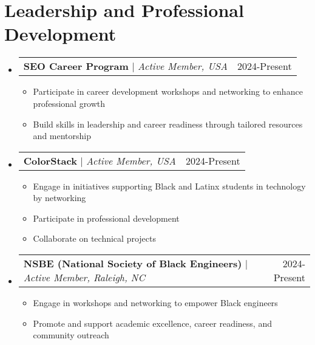 \documentclass[letterpaper,11pt]{article}
\makeatletter
\newcommand{\resumeItem}[1]{
  \item\small{
    {#1 \vspace{-2pt}}
  }
}
\newcommand{\resumeProjectHeading}[2]{
    \item
    \begin{tabular*}{0.97\textwidth}{l@{\extracolsep{\fill}}r}
      \small#1 & #2 \\
    \end{tabular*}\vspace{-7pt}
}
\newcommand{\resumeSubHeadingListStart}{\begin{itemize}[leftmargin=0.15in, label={}]}
\newcommand{\resumeSubHeadingListEnd}{\end{itemize}}
\newcommand{\resumeItemListStart}{\begin{itemize}}
\newcommand{\resumeItemListEnd}{\end{itemize}\vspace{-5pt}}
\makeatother
\begin{document}
 
 \section{Leadership and Professional Development}
    \resumeSubHeadingListStart
        \resumeProjectHeading
          {\textbf{SEO Career Program} $|$ \emph{Active Member, USA}}{2024-Present}
          \resumeItemListStart
            \resumeItem{Participate in career development workshops and networking to enhance professional growth}
            \resumeItem{Build skills in leadership and career readiness through tailored resources and mentorship}
          \resumeItemListEnd
      \resumeProjectHeading
          {\textbf{ColorStack} $|$ \emph{Active Member, USA}}{2024-Present}
          \resumeItemListStart
            \resumeItem{Engage in initiatives supporting Black and Latinx students in technology by networking}
            \resumeItem{Participate in professional development}
            \resumeItem{Collaborate on technical projects}
          \resumeItemListEnd
      \resumeProjectHeading
          {\textbf{NSBE (National Society of Black Engineers)} $|$ \emph{Active Member, Raleigh, NC}}{2024-Present}
          \resumeItemListStart
            \resumeItem{Engage in workshops and networking to empower Black engineers}
            \resumeItem{Promote and support academic excellence, career readiness, and community outreach}
          \resumeItemListEnd
    \resumeSubHeadingListEnd

\end{document}
